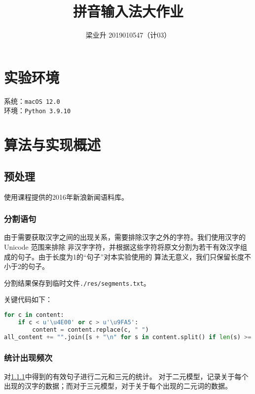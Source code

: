 \documentclass[a4paper]{article}
\begin{document}
\title{拼音输入法大作业}
\author{梁业升 2019010547（计03）}

\maketitle

\section*{实验环境}

系统：\texttt{macOS 12.0}\\
环境：\texttt{Python 3.9.10}

\section{算法与实现概述}

\subsection{预处理}

使用课程提供的2016年新浪新闻语料库。

\subsubsection{分割语句}\label{split}

由于需要获取汉字之间的出现关系，需要排除汉字之外的字符。我们使用汉字的 Unicode 范围来排除
非汉字字符，并根据这些字符将原文分割为若干有效汉字组成的句子。由于长度为1的“句子”对本实验使用的
算法无意义，我们只保留长度不小于2的句子。

分割结果保存到临时文件\texttt{./res/segments.txt}。

关键代码如下：

\begin{lstlisting}[language=python]
for c in content:
    if c < u'\u4E00' or c > u'\u9FA5':
        content = content.replace(c, " ")
all_content += "".join([s + "\n" for s in content.split() if len(s) >= 2])
\end{lstlisting}

\subsubsection{统计出现频次}\label{stats}

对\ref{split}中得到的有效句子进行二元和三元的统计。
对于二元模型，记录关于每个出现的汉字的数据；而对于三元模型，对于关于每个出现的二元词的数据。
\end{document}
